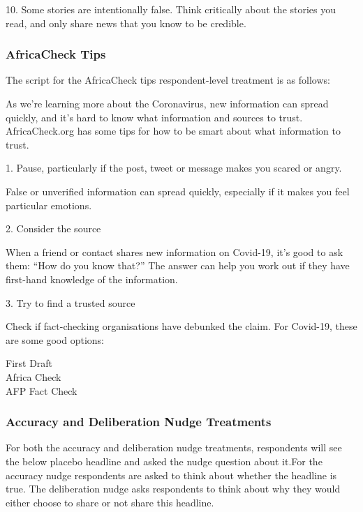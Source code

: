 \documentclass[letterpaper, 12pt, parskip=full,]{scrartcl}
\begin{document}
10. Some stories are intentionally false. Think critically about the stories you read, and only share news that you know to be credible.



\subsubsection{AfricaCheck Tips}\label{sec:actips}
The script for the AfricaCheck tips respondent-level treatment is as follows:

As we're learning more about the Coronavirus, new information can spread quickly, and it's hard to know what information and sources to trust. AfricaCheck.org has some tips for how to be smart about what information to trust. 

1. Pause, particularly if the post, tweet or message makes you scared or angry. 

False or unverified information can spread quickly, especially if it makes you feel particular emotions.

2. Consider the source

When a friend or contact shares new information on Covid-19, it’s good to ask them: “How do you know that?” The answer can help you work out if they have first-hand knowledge of the information.

3. Try to find a trusted source

Check if fact-checking organisations have debunked the claim. For Covid-19, these are some good options:

First Draft\\
Africa Check\\
AFP Fact Check

\subsubsection{Accuracy and Deliberation Nudge Treatments}\label{sec:nudge}

For both the accuracy and deliberation nudge treatments, respondents will see the below placebo headline and asked the nudge question about it.For the accuracy nudge respondents are asked to think about whether the headline is true. The deliberation nudge asks respondents to think about why they would either choose to share or not share this headline.
\end{document}

